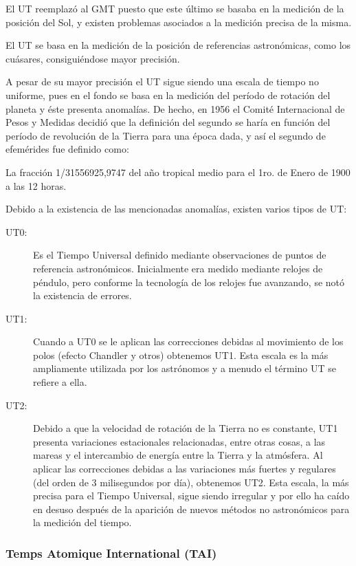 El UT reemplaz\'o al GMT puesto que este \'ultimo se basaba en la medici\'on de la posici\'on del Sol, y existen problemas asociados a la medici\'on precisa de la misma.

El UT se basa en la medici\'on de la posici\'on de referencias astron\'omicas, como los cu\'asares, consigui\'endose mayor precisi\'on.

 A pesar de su mayor precisión el UT sigue siendo una escala de tiempo no uniforme, pues en el fondo se basa en la medición del período de rotación del planeta y éste presenta anomalías. De hecho, en 1956 el Comité Internacional de Pesos y Medidas decidió que la definición del segundo se haría en función del período de revolución de la Tierra para una época dada, y así el segundo de efemérides fue definido como:

La fracción 1/31556925,9747 del año tropical medio para el 1ro. de Enero de 1900 a las 12 horas.

Debido a la existencia de las mencionadas anomalías, existen varios tipos de UT:
\begin{description}

\item [UT0:] Es el Tiempo Universal definido mediante observaciones de
  puntos de referencia astronómicos. Inicialmente era medido mediante
  relojes de péndulo, pero conforme la tecnología de los relojes fue
  avanzando, se notó la existencia de errores.


\item [UT1:] Cuando a UT0 se le aplican las correcciones debidas al
  movimiento de los polos (efecto Chandler y otros) obtenemos
  UT1. Esta escala es la más ampliamente utilizada por los astrónomos
  y a menudo el término UT se refiere a ella.


\item [UT2:] Debido a que la velocidad de rotación de la Tierra no es
  constante, UT1 presenta variaciones estacionales relacionadas, entre
  otras cosas, a las mareas y el intercambio de energía entre la
  Tierra y la atmósfera. Al aplicar las correcciones debidas a las
  variaciones más fuertes y regulares (del orden de 3 milisegundos por
  día), obtenemos UT2. Esta escala, la más precisa para el Tiempo
  Universal, sigue siendo irregular y por ello ha caído en desuso
  después de la aparición de nuevos métodos no astronómicos para la
  medición del tiempo.
\end{description}


\subsubsection{ Temps Atomique International (TAI)}
\label{sec:temps.atomique.international}

